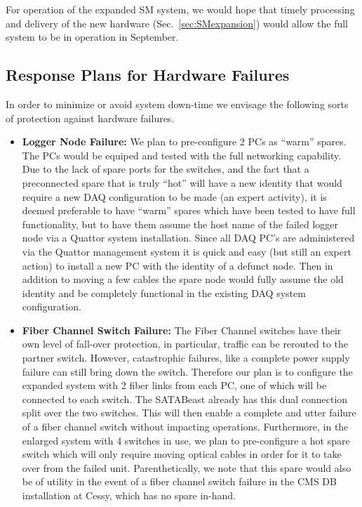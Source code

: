 For operation of the expanded SM system, we
would hope that timely processing and delivery of the new
hardware (Sec.~\ref{sec:SMexpansion}) would allow the full system 
to be in operation in September. 


\subsection{Response Plans for Hardware Failures \label{sec:SMhardfail}}

In order to minimize or avoid system down-time we envisage the following
sorts of protection against hardware failures.

\begin{itemize} 
\item {\bf Logger Node Failure:} We plan to pre-configure 2 PCs as ``warm'' spares.
The PCs would be equiped and tested with the full networking capability.
Due to the lack of spare ports for the switches, and the fact that
a preconnected spare that is truly ``hot'' will have a new identity
that would require a new DAQ configuration to be made (an expert activity),
it is deemed preferable to have ``warm'' spares which have been tested
to have full functionality, but to have them assume the host name of the
failed logger node via a Quattor system installation.
Since all DAQ PC's are administered via the Quattor management system
it is quick and easy (but still an expert action) to install a new PC with
the identity of a defunct node.
Then in addition to moving a few cables the spare node would fully assume
the old identity and be completely
functional in the existing DAQ system configuration. 

\item {\bf Fiber Channel Switch Failure:} The Fiber Channel switches have 
their own level of fall-over protection, in particular, traffic can
be rerouted to the partner switch.
However, catastrophic failures, like a complete power supply failure
can still bring down the switch.
Therefore our plan is to configure the expanded system with 2 fiber links
from each PC, one of which will be connected to each switch.
The SATABeast already has this dual connection split over the two switches.
This will then enable a complete and utter failure of a fiber channel
switch without impacting operations.
Furthermore, in the enlarged system with 4 switches in use, we plan to
pre-configure a hot spare switch which will only require moving optical
cables in order for it to take over from the failed unit.
Parenthetically, we note that this spare would also be of utility
in the event of a fiber channel switch failure in the CMS DB
installation at Cessy,  which has no spare in-hand.


\end{itemize}
